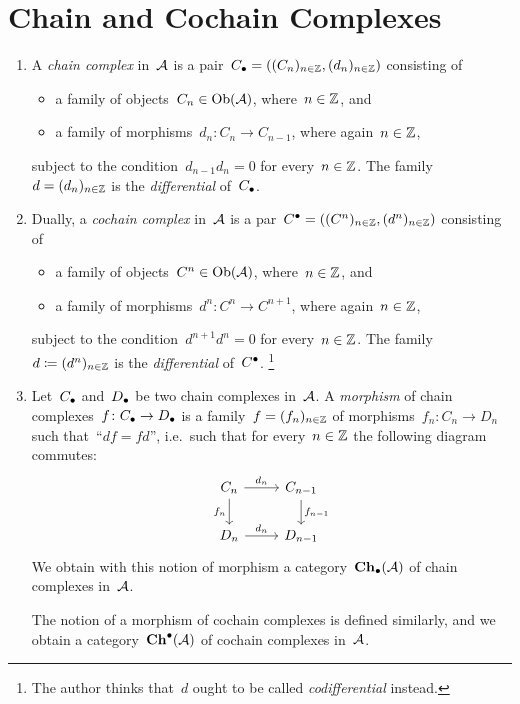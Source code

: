 \section{Chain and Cochain Complexes}


\begin{definition}
  \leavevmode
  \begin{enumerate}
    \item
      A \emph{chain complex} in~$\mathcal{A}$ is a pair~$C_\bullet = ( (C_n)_{n \in \mathbb{Z}}, (d_n)_{n \in \mathbb{Z}} )$ consisting of
      \begin{itemize}
        \item
          a family of objects~$C_n \in \operatorname{Ob}(\mathcal{A})$, where~$n \in \mathbb{Z}$, and
        \item
          a family of morphisms~$d_n \colon C_n \to C_{n-1}$, where again~$n \in \mathbb{Z}$,
      \end{itemize}
      subject to the condition~$d_{n-1} d_n = 0$ for every~$n \in \mathbb{Z}$.
      The family~$d = (d_n)_{n \in \mathbb{Z}}$ is the \emph{differential} of~$C_\bullet$.
    \item
      Dually, a \emph{cochain complex} in~$\mathcal{A}$ is a par~$C^\bullet = ( (C^n)_{n \in \mathbb{Z}}, (d^n)_{n \in \mathbb{Z}} )$ consisting of
      \begin{itemize}
        \item
          a family of objects~$C^n \in \operatorname{Ob}(\mathcal{A})$, where~$n \in \mathbb{Z}$, and
        \item
          a family of morphisms~$d^n \colon C^n \to C^{n+1}$, where again~$n \in \mathbb{Z}$,
      \end{itemize}
      subject to the condition~$d^{n+1} d^n = 0$ for every~$n \in \mathbb{Z}$.
      The family~$d \coloneqq (d^n)_{n \in \mathbb{Z}}$ is the \emph{differential} of~$C^\bullet$.%
      \footnote{The author thinks that~$d$ ought to be called \emph{codifferential} instead.}
    \item
      Let~$C_\bullet$ and~$D_\bullet$ be two chain complexes in~$\mathcal{A}$.
      A \emph{morphism} of chain complexes~$f \colon C_\bullet \to D_\bullet$ is a family~$f = (f_n)_{n \in \mathbb{Z}}$ of morphisms~$f_n \colon C_n \to D_n$ such that~\enquote{$df = fd$}, i.e.\ such that for every~$n \in \mathbb{Z}$ the following diagram commutes:
      \[
        \begin{tikzcd}
            C_n
            \arrow{r}[above]{d_n}
            \arrow{d}[left]{f_n}
          & C_{n-1}
            \arrow{d}[right]{f_{n-1}}
          \\
            D_n
            \arrow{r}[above]{d_n}
          & D_{n-1}
        \end{tikzcd}
      \]
      We obtain with this notion of morphism a category~$\mathbf{Ch}_\bullet(\mathcal{A})$ of chain complexes in~$\mathcal{A}$.
      
      The notion of a morphism of cochain complexes is defined similarly, and we obtain a category~$\mathbf{Ch}^\bullet(\mathcal{A})$ of cochain complexes in~$\mathcal{A}$.
  \end{enumerate}
\end{definition}


